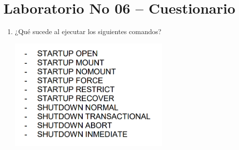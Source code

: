 \section{Laboratorio No 06 – Cuestionario} 

\begin{enumerate}[1.]
	\item ¿Qué sucede al ejecutar los siguientes comandos?
	\begin{center}
	\includegraphics[width=8cm]{./Imagenes/actividad_5_1_lab_06}
	\end{center}	


\end{enumerate}
